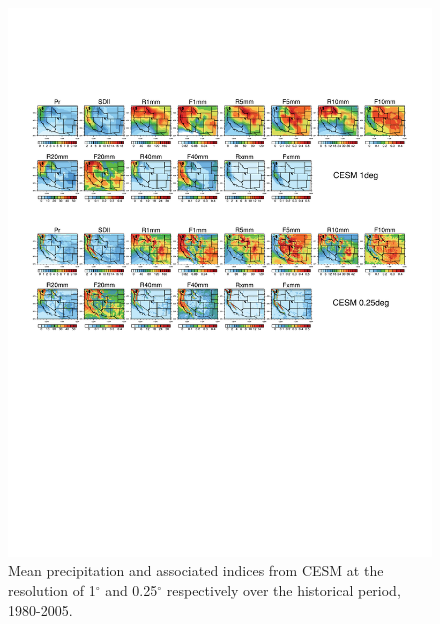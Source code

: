 \documentclass{ametsoc}
\begin{document}
\begin{figure}
\begin{center}
\includegraphics[width=6in]{wd_index_hist_se1deg_fvQuarterdeg_cesm.pdf}
\caption{Mean precipitation and associated indices from CESM at the resolution of 1$^\circ$ and 0.25$^\circ$ respectively over the historical period, 1980-2005.}
\end{center}
\label{fig:S3}
\end{figure}
\end{document}
